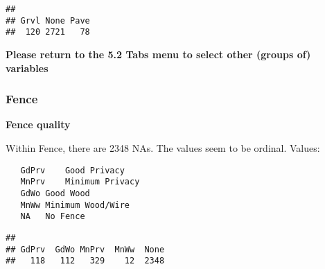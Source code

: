 \documentclass[]{article}
\newenvironment{Shaded}{\begin{snugshade}}{\end{snugshade}}
\newcommand{\KeywordTok}[1]{\textcolor[rgb]{0.13,0.29,0.53}{\textbf{#1}}}
\newcommand{\DataTypeTok}[1]{\textcolor[rgb]{0.13,0.29,0.53}{#1}}
\newcommand{\StringTok}[1]{\textcolor[rgb]{0.31,0.60,0.02}{#1}}
\newcommand{\OperatorTok}[1]{\textcolor[rgb]{0.81,0.36,0.00}{\textbf{#1}}}
\newcommand{\NormalTok}[1]{#1}
\begin{document}
\begin{Shaded}
\end{Shaded}

\begin{verbatim}
## 
## Grvl None Pave 
##  120 2721   78
\end{verbatim}

\textbf{Please return to the 5.2 Tabs menu to select other (groups of)
variables}

\subsubsection{Fence}\label{fence}

\textbf{Fence quality}

Within Fence, there are 2348 NAs. The values seem to be ordinal. Values:

\begin{verbatim}
   GdPrv    Good Privacy
   MnPrv    Minimum Privacy
   GdWo Good Wood
   MnWw Minimum Wood/Wire
   NA   No Fence
\end{verbatim}

\begin{Shaded}
\end{Shaded}

\begin{verbatim}
## 
## GdPrv  GdWo MnPrv  MnWw  None 
##   118   112   329    12  2348
\end{verbatim}

\begin{Shaded}
\end{Shaded}
\end{document}
